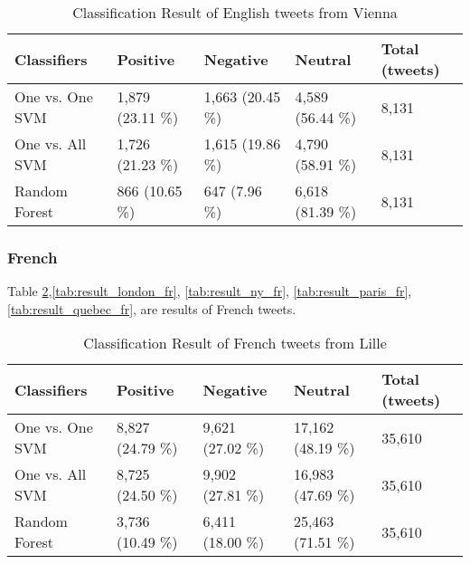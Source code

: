\begin{table}[ht]
	\caption{Classification Result of English tweets from Vienna}
	\begin{tabular}{|l|p{1.8cm}|p{1.8cm}|p{1.8cm}|p{1.8cm}|} \hline
	Classifiers & Positive & Negative & Neutral & Total (tweets)\\ \hline
	
	One vs. One SVM & 1,879 (23.11 \%)& 1,663 (20.45 \%)& 4,589 (56.44 \%)& 8,131 \\ \hline
	One vs. All SVM & 1,726 (21.23 \%)& 1,615 (19.86 \%)& 4,790 (58.91 \%)& 8,131 \\ \hline
	Random Forest   & 866 (10.65 \%) & 647 (7.96 \%) & 6,618 (81.39 \%)& 8,131 \\ \hline
	\end{tabular}
	\label{tab:result_vienna_en}
\end{table}


\begin{comment}

\begin{table}[ht]
	\caption{Classification Result of Quebec}
	\begin{tabular}{|l|p{1.8cm}|p{1.8cm}|p{1.8cm}|p{1.8cm}|} \hline
	Classifiers & Positive & Negative & Neutral & Total (tweets)\\ \hline
	( \%)
	\end{tabular}
	\label{tab:result_quebec_en}
\end{table}


\end{comment}
\clearpage
\subsubsection{French}
Table \ref{tab:result_lille_fr},\ref{tab:result_london_fr}, \ref{tab:result_ny_fr}, \ref{tab:result_paris_fr}, \ref{tab:result_quebec_fr}, are results of French tweets.

\begin{table}[ht]
	\caption{Classification Result of French tweets from Lille}
	\begin{tabular}{|l|p{1.8cm}|p{1.8cm}|p{1.8cm}|p{1.8cm}|} \hline
	Classifiers & Positive & Negative & Neutral & Total (tweets)\\ \hline
	
	One vs. One SVM & 8,827 (24.79 \%)& 9,621 (27.02 \%)& 17,162 (48.19 \%)& 35,610 \\ \hline
	One vs. All SVM & 8,725 (24.50 \%)& 9,902 (27.81 \%)& 16,983 (47.69 \%)& 35,610 \\ \hline
	Random Forest   & 3,736 (10.49 \%)& 6,411 (18.00 \%)& 25,463 (71.51 \%)& 35,610 \\ \hline
	\end{tabular}
	\label{tab:result_lille_fr}
\end{table}



